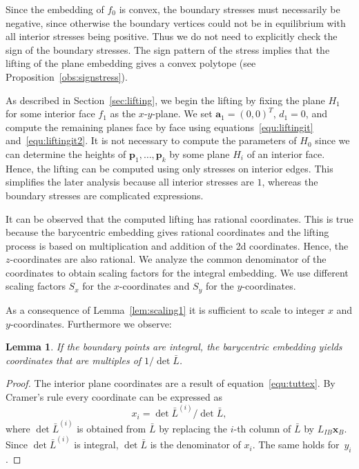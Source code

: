 \documentclass{article}
\theoremstyle{plain} \newtheorem{thm}{Theorem}[section]
\newtheorem{lem}{Lemma}[section]
\newcommand{\p}{\mathbf{p}}
\begin{document}
Since the embedding of $f_0$ is convex, 
the boundary stresses must necessarily be negative,
since otherwise the boundary vertices could not be in equilibrium with all
interior stresses being positive.
Thus we do not need to explicitly check the sign of the boundary stresses. The sign pattern of 
the stress implies that the lifting of the plane embedding gives a convex
polytope (see Proposition~\ref{obs:signstress}).

As described in Section~\ref{sec:lifting},
we begin the lifting by fixing the plane $H_1$ for some interior face $f_1$ as the $x$-$y$-plane. We set
$\mathbf{a}_1=(0,0)^T$, $d_1=0$,
and compute the remaining planes face by face using equations~\eqref{equ:liftingit}
 and~\eqref{equ:liftingit2}.
It is not necessary to compute the parameters
of $H_0$ since we can determine the heights of $\p_1,\ldots,\p_k$ by some plane $H_i$ of
an interior face. Hence, the lifting can be computed using only stresses on interior edges.
This simplifies the later analysis because all interior 
stresses are $1$, whereas the boundary stresses are complicated expressions.








It can be observed that the computed lifting has rational coordinates. This is true because the barycentric embedding gives rational coordinates and the lifting process is based on multiplication and addition of the 2d coordinates. Hence, the $z$-coordinates are also rational.
We analyze the common denominator of the coordinates to obtain scaling factors for the integral embedding. We use different scaling factors $S_x$ for 
the $x$-coordinates and $S_y$ for the $y$-coordinates.


As a consequence of Lemma~\ref{lem:scaling1} it is sufficient to 
scale to integer $x$ and $y$-coordinates.
Furthermore we observe:
\begin{lem}\label{lem:cramer}
If the boundary points are integral, the barycentric embedding yields
coordinates that are multiples of $1/ \det \bar L$.
\end{lem}
\begin{proof}
The interior plane coordinates are a result of equation~\eqref{equ:tuttex}.
By Cramer's rule every coordinate can be expressed as 
\[x_i=\det{\bar{L}^{(i)}} / \det{\bar{L}},\]
where $\det{\bar{L}^{(i)}}$ is obtained from $\bar{L}$ by replacing the
$i$-th column of $\bar{L}$ by $L_{IB}\mathbf{x}_B$. 
Since $\det{\bar{L}^{(i)}}$ is integral,  $\det{\bar{L}}$ is the denominator of $x_i$.
The same holds for~$y_i$.
\end{proof}
\end{document}
